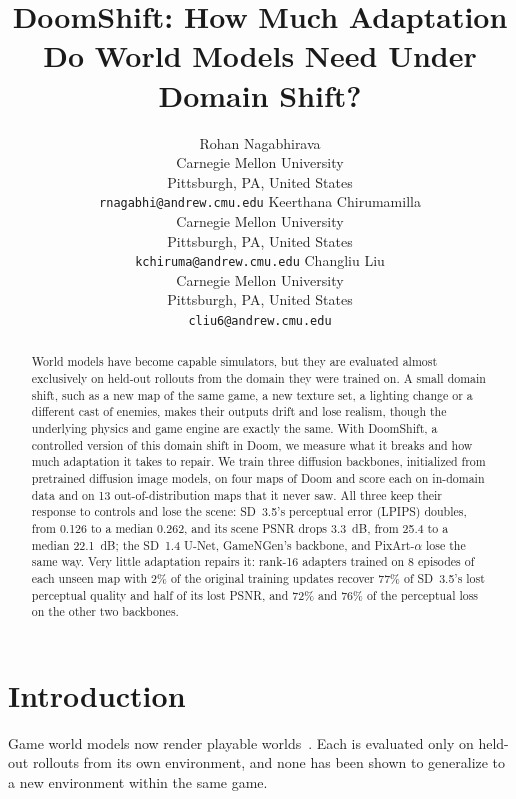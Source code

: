 \documentclass{article}
\title{DoomShift: How Much Adaptation Do World Models Need Under Domain Shift?}
\author{
  Rohan Nagabhirava\\
  Carnegie Mellon University\\
  Pittsburgh, PA, United States\\
  \texttt{rnagabhi@andrew.cmu.edu}
  \And
  Keerthana Chirumamilla\\
  Carnegie Mellon University\\
  Pittsburgh, PA, United States\\
  \texttt{kchiruma@andrew.cmu.edu}
  \And
  Changliu Liu\\
  Carnegie Mellon University\\
  Pittsburgh, PA, United States\\
  \texttt{cliu6@andrew.cmu.edu}
}
\begin{document}
\raggedbottom
\setlength{\textfloatsep}{12pt plus 2pt minus 4pt}
\maketitle


\begin{abstract}
World models have become capable simulators, but they are evaluated almost exclusively on held-out rollouts from the domain they were trained on.
A small domain shift, such as a new map of the same game, a new texture set, a lighting change or a different cast of enemies, makes their outputs drift and lose realism, though the underlying physics and game engine are exactly the same.
With DoomShift, a controlled version of this domain shift in Doom, we measure what it breaks and how much adaptation it takes to repair.
We train three diffusion backbones, initialized from pretrained diffusion image models, on four maps of Doom and score each on in-domain data and on 13 out-of-distribution maps that it never saw.
All three keep their response to controls and lose the scene: SD~3.5's perceptual error (LPIPS) doubles, from 0.126 to a median 0.262, and its scene PSNR drops 3.3~dB, from 25.4 to a median 22.1~dB; the SD~1.4 U-Net, GameNGen's backbone, and PixArt-$\alpha$ lose the same way.
Very little adaptation repairs it: rank-16 adapters trained on 8 episodes of each unseen map with 2\% of the original training updates recover 77\% of SD~3.5's lost perceptual quality and half of its lost PSNR, and 72\% and 76\% of the perceptual loss on the other two backbones.
\end{abstract}



\section{Introduction}
\label{sec:intro}

Game world models now render playable worlds~\citep{valevski2024gamengen,alonso2024diamond,bruce2024genie}.
Each is evaluated only on held-out rollouts from its own environment, and none has been shown to generalize to a new environment within the same game.
\end{document}
